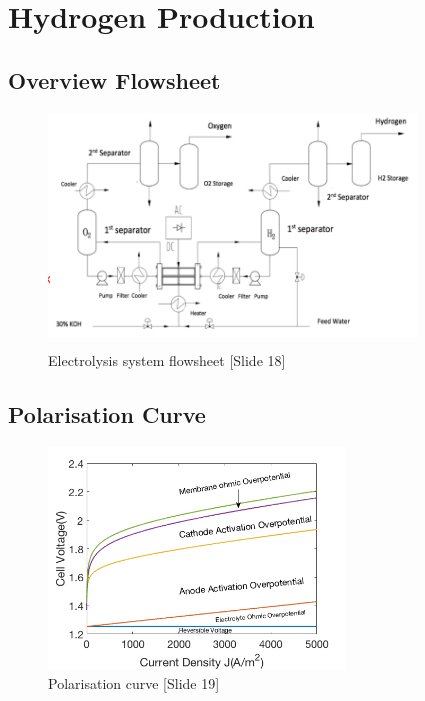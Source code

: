 

\section{Hydrogen Production}

    \subsection{Overview Flowsheet}
    \begin{figure}[H]
        \centering
        \includegraphics[width=0.87\textwidth]{flowsheet.png}
        \caption{Electrolysis system flowsheet [Slide 18]}
        \label{fig:plant_schematic}
    \end{figure}
    
  \subsection{Polarisation Curve}
\begin{figure}[H]
\centering
\includegraphics[width=0.7\textwidth]{pres3.png}
\caption{Polarisation curve [Slide 19]} 
\end{figure}    



